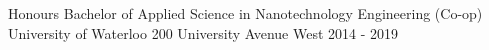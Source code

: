 

\begin{cventries}

  \cventry
    {Honours Bachelor of Applied Science in Nanotechnology Engineering (Co-op)} %
    {University of Waterloo} %
    {200 University Avenue West} %
    {2014 - 2019} %
    {
    }
\end{cventries}

\vspace{-0.55cm}




